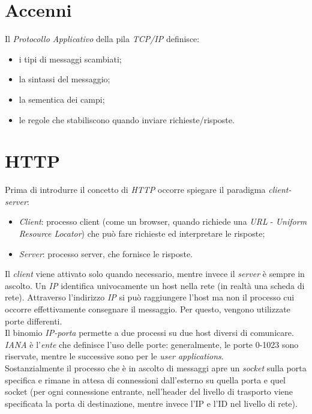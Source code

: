 \section{Accenni}
Il \textit{Protocollo Applicativo} della pila \textit{TCP/IP} definisce:
\begin{itemize}
    \item i tipi di messaggi scambiati;
    \item la sintassi del messaggio;
    \item la sementica dei campi;
    \item le regole che stabiliscono quando inviare richieste/risposte.
\end{itemize}

\section{HTTP}
Prima di introdurre il concetto di \textit{HTTP} occorre spiegare il paradigma \textit{client-server}:
\begin{itemize}
    \item \textit{Client}: processo client (come un browser, quando richiede una \textit{URL} - \textit{Uniform Resource Locator}) che può fare richieste ed interpretare le risposte;
    \item \textit{Server}: processo server, che fornisce le risposte.
\end{itemize}
Il \textit{client} viene attivato solo quando necessario, mentre invece il \textit{server} è sempre in ascolto.
Un \textit{IP} identifica univocamente un host nella rete (in realtà una scheda di rete).
Attraverso l'indirizzo \textit{IP} si può raggiungere l'host ma non il processo cui occorre effettivamente consegnare il messaggio. Per questo, vengono utilizzate porte differenti. \\
Il binomio \textit{IP-porta} permette a due processi su due host diversi di comunicare. \\
\textit{IANA} è l'\textit{ente} che definisce l'uso delle porte: generalmente, le porte 0-1023 sono riservate, mentre le successive sono per le \textit{user applications}. \\
Sostanzialmente il processo che è in ascolto di messaggi apre un \textit{socket} sulla porta specifica e rimane in attesa di connessioni dall'esterno su quella porta e quel socket (per ogni connessione entrante, nell'header del livello di trasporto viene specificata la porta di destinazione, mentre invece l'IP e l'ID nel livello di rete). \\
